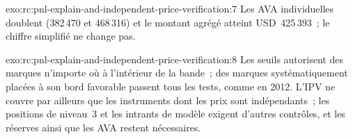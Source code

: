 \begin{solution}{exo:rc:pnl-explain-and-independent-price-verification:7}
Les AVA individuelles doublent (382\,470 et 468\,316) et le montant agrégé atteint USD~425\,393~; le
chiffre simplifié ne change pas.
\end{solution}

\begin{solution}{exo:rc:pnl-explain-and-independent-price-verification:8}
Les seuils autorisent des marques n'importe où à l'intérieur de la bande~; des marques systématiquement placées à son bord favorable passent
tous les tests, comme en 2012. L'IPV ne couvre par ailleurs que les instruments dont les prix sont indépendants~; les positions de niveau~3 et
les intrants de modèle exigent d'autres contrôles, et les réserves ainsi que les AVA restent nécessaires.
\end{solution}


